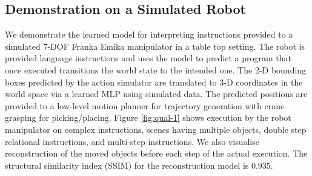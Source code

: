 \subsection{Demonstration on a Simulated Robot}
%
We demonstrate the learned model for interpreting instructions 
provided to a simulated 7-DOF Franka Emika manipulator in a table top setting. 
%
The robot is provided language instructions and uses the model to predict a program that once executed transitions the world state to the intended one. The 2-D bounding boxes predicted by the action simulator are translated to 3-D coordinates in the world space via a learned MLP using simulated data.
%
The predicted positions are provided to a low-level motion planner for trajectory generation with crane grasping for picking/placing. 
% 
Figure \ref{fig:qual-1} shows execution by the robot manipulator on complex instructions, scenes having multiple objects, double step relational instructions, and multi-step instructions. We also visualise reconstruction of the moved objects before each step of the actual execution. The structural similarity index (SSIM) \cite{ssim2004} for the reconstruction model is 0.935.
%

\iffalse

%

